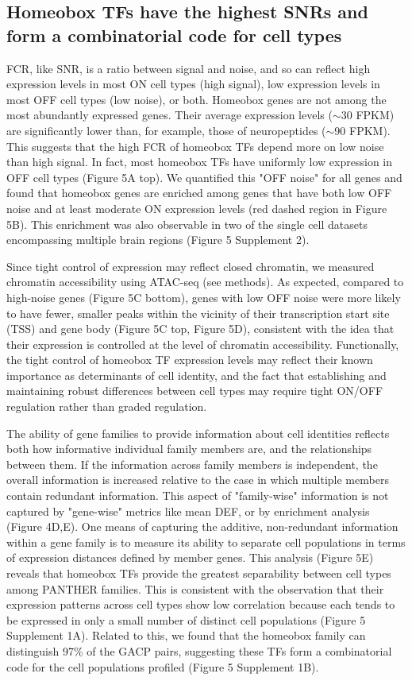 \subsection{Homeobox TFs have the highest SNRs and form a combinatorial code for cell types}
FCR, like SNR, is a ratio between signal and noise, and so can reflect high expression levels in most ON cell types (high signal), low expression levels in most OFF cell types (low noise), or both. Homeobox genes are not among the most abundantly expressed genes. Their average expression levels ($\sim$30 FPKM) are significantly lower than, for example, those of neuropeptides ($\sim$90 FPKM). This suggests that the high FCR of homeobox TFs depend more on low noise than high signal. In fact, most homeobox TFs have uniformly low expression in OFF cell types (Figure 5A top). We quantified this "OFF noise" for all genes and found that homeobox genes are enriched among genes that have both low OFF noise and at least moderate ON expression levels (red dashed region in Figure 5B). This enrichment was also observable in two of the single cell datasets encompassing multiple brain regions (Figure 5 Supplement 2). 

Since tight control of expression may reflect closed chromatin, we measured chromatin accessibility using ATAC-seq (see methods). As expected, compared to high-noise genes (Figure 5C bottom), genes with low OFF noise were more likely to have fewer, smaller peaks within the vicinity of their transcription start site (TSS) and gene body (Figure 5C top, Figure 5D), consistent with the idea that their expression is controlled at the level of chromatin accessibility. Functionally, the tight control of homeobox TF expression levels may reflect their known importance as determinants of cell identity, and the fact that establishing and maintaining robust differences between cell types may require tight ON/OFF regulation rather than graded regulation.

The ability of gene families to provide information about cell identities reflects both how informative individual family members are, and the relationships between them. If the information across family members is independent, the overall information is increased relative to the case in which multiple members contain redundant information. This aspect of "family-wise" information is not captured by "gene-wise" metrics like mean DEF, or by enrichment analysis (Figure 4D,E). One means of capturing the additive, non-redundant information within a gene family is to measure its ability to separate cell populations in terms of expression distances defined by member genes. This analysis (Figure 5E) reveals that homeobox TFs provide the greatest separability between cell types among PANTHER families. This is consistent with the observation that their expression patterns across cell types show low correlation because each tends to be expressed in only a small number of distinct cell populations (Figure 5 Supplement 1A). Related to this, we found that the homeobox family can distinguish 97\% of the GACP pairs, suggesting these TFs form a combinatorial code for the cell populations profiled (Figure 5 Supplement 1B). 

